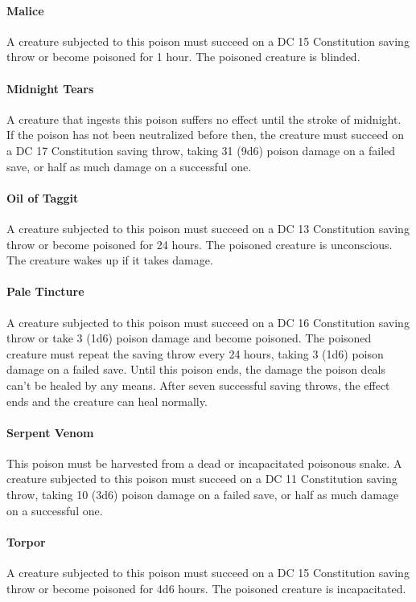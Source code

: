     \paragraph{Malice}
        A creature subjected to this poison must succeed on a DC 15 Constitution saving throw or become poisoned for 1 hour.
        The poisoned creature is blinded.
    \paragraph{Midnight Tears}
        A creature that ingests this poison suffers no effect until the stroke of midnight.
        If the poison has not been neutralized before then, the creature must succeed on a DC 17 Constitution saving throw, taking 31 (9d6) poison damage on a failed save, or half as much damage on a successful one.
    \paragraph{Oil of Taggit}
        A creature subjected to this poison must succeed on a DC 13 Constitution saving throw or become poisoned for 24 hours.
        The poisoned creature is unconscious.
        The creature wakes up if it takes damage.
    \paragraph{Pale Tincture}
        A creature subjected to this poison must succeed on a DC 16 Constitution saving throw or take 3 (1d6) poison damage and become poisoned.
        The poisoned creature must repeat the saving throw every 24 hours, taking 3 (1d6) poison damage on a failed save.
        Until this poison ends, the damage the poison deals can't be healed by any means.
        After seven successful saving throws, the effect ends and the creature can heal normally.
    \paragraph{Serpent Venom}
        This poison must be harvested from a dead or incapacitated poisonous snake.
        A creature subjected to this poison must succeed on a DC 11 Constitution saving throw, taking 10 (3d6) poison damage on a failed save, or half as much damage on a successful one.
    \paragraph{Torpor}
        A creature subjected to this poison must succeed on a DC 15 Constitution saving throw or become poisoned for 4d6 hours.
        The poisoned creature is incapacitated.
